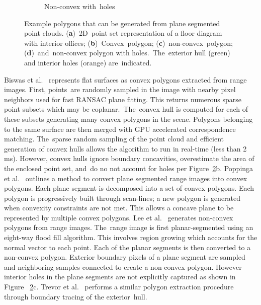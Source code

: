 \begin{figure}[H]
\begin{subfigure}{.24\linewidth}
    \caption{\label{fig:ch3_convex_concave_4}Non-convex with~holes}\vspace{6pt}
  \end{subfigure}
  \caption[Example polygons that can be generated from plane segmented point clouds]{Example polygons that can be generated from plane segmented point clouds. (\textbf{a})~2D~point set representation of a floor diagram with interior offices;  (\textbf{b})~Convex~polygon; (\textbf{c})~non-convex~polygon; (\textbf{d})~and~non-convex polygon with holes.~The~exterior hull (green) and interior holes (orange) are~indicated. }\label{fig:ch3_convex_concave}
\end{figure}


Biswas et al.~\cite{biswas_planar_2012} represents flat surfaces as convex polygons extracted from range images. First, points~are randomly sampled in the image with nearby pixel neighbors used for fast RANSAC plane fitting. This returns numerous sparse point subsets which may be coplanar.~The~convex hull is computed for each of these subsets generating many convex polygons in the scene. Polygons belonging to the same surface are then merged with \ac{GPU} accelerated correspondence matching. The~sparse random sampling of the point cloud and efficient generation of convex hulls allows the algorithm to run in real-time (less than 2 ms). However, convex hulls ignore boundary concavities, overestimate the area of the enclosed point set, and~do no not account for holes per Figure~\ref{fig:ch3_convex_concave}b. Poppinga et al.~\cite{poppinga_fast_2008} outlines a  method to convert plane segmented range images into convex polygons. 
Each plane segment is decomposed into  a set of convex polygons. Each polygon is progressively built through scan-lines; a new polygon is generated when convexity constraints are not met. This allows a concave plane to be represented by multiple convex polygons. 
Lee et al.~\cite{lee_indoor_2012-1} generates non-convex polygons from range images. The~range image is first planar-segmented using an eight-way flood fill algorithm. This involves region growing which accounts for the normal vector to each point. Each of the planar segments is then converted to a non-convex polygon. Exterior boundary pixels of a plane segment are sampled and neighboring samples connected to create a non-convex polygon. However interior holes in the plane segments are not explicitly captured as shown in Figure ~\ref{fig:ch3_convex_concave}c. Trevor et al.~\cite{trevor2013efficient} performs a similar polygon extraction procedure through boundary tracing of the exterior~hull. 

